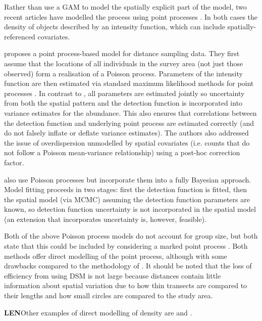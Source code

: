 \documentclass[a4paper,12pt]{article}
\begin{document}
Rather than use a GAM to model the spatially explicit part of the model, two recent articles \citep{Johnson:2010gf,Niemi:2010kx} have modelled the process using point processes \citep{cox1980point}. In both cases the density of objects described by an intensity function, which can include spatially-referenced covariates.

\cite{Johnson:2010gf} proposes a point process-based model for distance sampling data. They first assume that the locations of all individuals in the survey area (not just those observed) form a realisation of a Poisson process. Parameters of the intensity function are then estimated via standard maximum likelihood methods for point processes \citep{Baddeley:2000to}. In contrast to \cite{Hedley:2004et}, all parameters are estimated jointly so uncertainty from both the spatial pattern and the detection function is incorporated into variance estimates for the abundance. This also ensures that correlations between the detection function and underlying point process are estimated correctly (and do not falsely inflate or deflate variance estimates). The authors also addressed the issue of overdispersion unmodelled by spatial covariates (i.e. counts that do not follow a Poisson mean-variance relationship) using a post-hoc correction factor.

\cite{Niemi:2010kx} also use Poisson processes but incorporate them into a fully Bayesian approach. Model fitting proceeds in two stages: first the detection function is fitted, then the spatial model (via MCMC) assuming the detection function parameters are known, so detection function uncertainty is not incorporated in the spatial model (an extension that incorporates uncertainty is, however, feasible).

Both of the above Poisson process models do not account for group size, but both state that this could be included by considering a marked point process \citep[Section 5.5]{cox1980point}. Both methods offer direct modelling of the point process, although with some drawbacks compared to the methodology of \cite{Hedley:2004et}. It should be noted that the loss of efficiency from using DSM is not large \citep[p. 313]{Buckland:2004ts} because distances contain little information about spatial variation due to how thin transects are compared to their lengths and how small circles are compared to the study area.

\textbf{LEN}Other examples of direct modelling of density are \cite{Royle:2004tu} and \cite{Royle:2008wc}.
\end{document}
